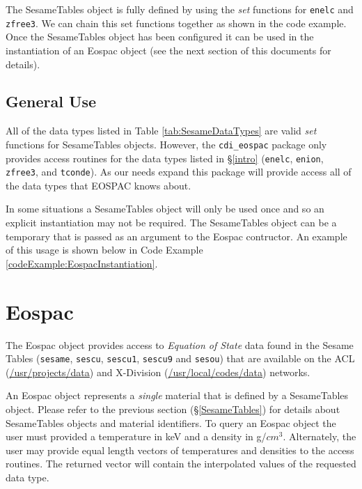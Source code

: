 \documentclass[11pt]{nmemo}
\begin{document}
The SesameTables object is fully defined by using the \emph{set}
functions for \texttt{enelc} and \texttt{zfree3}.  We can chain this
set functions together as shown in the code example.  Once the
SesameTables object has been configured it can be used in the
instantiation of an Eospac object (see the next section of this
documents for details).


\subsection{General Use}

All of the data types listed in Table \ref{tab:SesameDataTypes} are
valid \emph{set} functions for SesameTables objects.  However, the
\texttt{cdi\_eospac} package only provides access routines for the
data types listed in \S\ref{intro} (\texttt{enelc}, \texttt{enion},
\texttt{zfree3}, and \texttt{tconde}).  As our needs expand this
package will provide access all of the data types that EOSPAC knows
about.

In some situations a SesameTables object will only be used once and so
an explicit instantiation may not be required.  The SesameTables
object can be a temporary that is passed as an argument to the Eospac
contructor.  An example of this usage is shown below in Code Example
\ref{codeExample:EospacInstantiation}.




\section{Eospac}

The Eospac object provides access to \emph{Equation of State} data
found in the Sesame Tables (\texttt{sesame}, \texttt{sescu},
\texttt{sescu1}, \texttt{sescu9} and \texttt{sesou}) that are
available on the ACL (\url{/usr/projects/data}) and X-Division
(\url{/usr/local/codes/data}) networks.

An Eospac object represents a \emph{single} material that is defined
by a SesameTables object.  Please refer to the previous section
(\S\ref{SesameTables}) for details about SesameTables objects and
material identifiers.  To query an Eospac object the user must
provided a temperature in keV and a density in g/$cm^3$.  Alternately,
the user may provide equal length vectors of temperatures and
densities to the access routines.  The returned vector will contain
the interpolated values of the requested data type.
\end{document}
